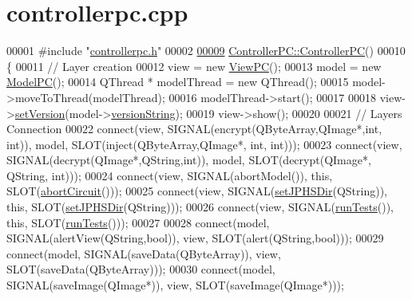 \hypertarget{controllerpc_8cpp_source}{\section{controllerpc.\-cpp}
}

\begin{DoxyCode}
00001 \textcolor{preprocessor}{#include "\hyperlink{controllerpc_8h}{controllerpc.h}"}
00002 
\hypertarget{controllerpc_8cpp_source_l00009}{}\hyperlink{class_controller_p_c_afa6c92d67bf3b6531c42385fc5938003}{00009} \hyperlink{class_controller_p_c_afa6c92d67bf3b6531c42385fc5938003}{ControllerPC::ControllerPC}()
00010 \{
00011     \textcolor{comment}{// Layer creation}
00012     view = \textcolor{keyword}{new} \hyperlink{class_view_p_c}{ViewPC}();
00013     model = \textcolor{keyword}{new} \hyperlink{class_model_p_c}{ModelPC}();
00014     QThread * modelThread = \textcolor{keyword}{new} QThread();
00015     model->moveToThread(modelThread);
00016     modelThread->start();
00017 
00018     view->\hyperlink{class_view_p_c_ac05220df875b7c4f24405a5742476ebf}{setVersion}(model->\hyperlink{class_model_p_c_a5f426725ccf7eefd3c77ea8c720264c9}{versionString});
00019     view->show();
00020 
00021     \textcolor{comment}{// Layers Connection}
00022     connect(view, SIGNAL(encrypt(QByteArray,QImage*,\textcolor{keywordtype}{int}, \textcolor{keywordtype}{int})), model, SLOT(inject(QByteArray,QImage*, \textcolor{keywordtype}{int},
       \textcolor{keywordtype}{int})));
00023     connect(view, SIGNAL(decrypt(QImage*,QString,\textcolor{keywordtype}{int})), model, SLOT(decrypt(QImage*, QString, \textcolor{keywordtype}{int})));
00024     connect(view, SIGNAL(abortModel()), \textcolor{keyword}{this}, SLOT(\hyperlink{class_controller_p_c_a8814989f7be1214e06b2e720889066b0}{abortCircuit}()));
00025     connect(view, SIGNAL(\hyperlink{class_controller_p_c_ac00d29685a7e5b780c01eb438e10f96d}{setJPHSDir}(QString)), \textcolor{keyword}{this}, SLOT(\hyperlink{class_controller_p_c_ac00d29685a7e5b780c01eb438e10f96d}{setJPHSDir}(QString)));
00026     connect(view, SIGNAL(\hyperlink{class_controller_p_c_aaa59fc90e1ef731eee4560ec87e43707}{runTests}()), \textcolor{keyword}{this}, SLOT(\hyperlink{class_controller_p_c_aaa59fc90e1ef731eee4560ec87e43707}{runTests}()));
00027 
00028     connect(model, SIGNAL(alertView(QString,\textcolor{keywordtype}{bool})), view, SLOT(alert(QString,\textcolor{keywordtype}{bool})));
00029     connect(model, SIGNAL(saveData(QByteArray)), view, SLOT(saveData(QByteArray)));
00030     connect(model, SIGNAL(saveImage(QImage*)), view, SLOT(saveImage(QImage*)));

\end{DoxyCode}
